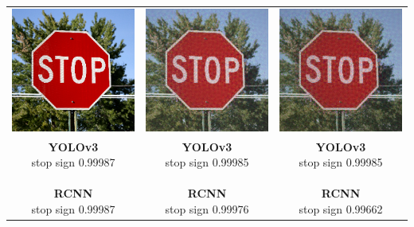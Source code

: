 \documentclass{article}
\begin{document}
\begin{center}
    \begin{tabular}{c c c}
        \includegraphics[width=0.3\linewidth]{../test_images/stop.png} & \includegraphics[width=0.3\linewidth]{../test_images/dispersion_reduced/stop25.png} & \includegraphics[width=0.3\linewidth]{../test_images/dispersion_reduced/stop50.png} \\

        \makecell[t]{\textbf{YOLOv3} \\ stop sign 0.99987 \\ \\ \textbf{RCNN} \\ stop sign 0.99987} & \makecell[t]{\textbf{YOLOv3} \\ stop sign 0.99985 \\ \\ \textbf{RCNN} \\ stop sign 0.99976} & \makecell[t]{\textbf{YOLOv3} \\ stop sign 0.99985 \\ \\ \textbf{RCNN} \\ stop sign 0.99662}
\end{tabular}
\end{center}
\end{document}
